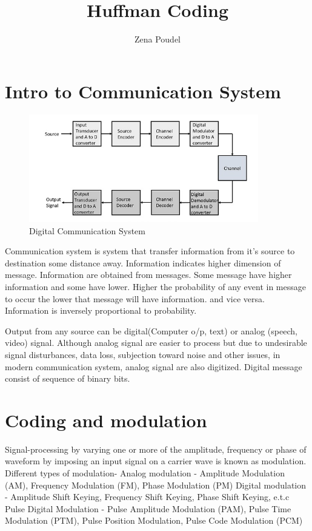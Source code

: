 \documentclass[10pt,a4paper]{article}
\author{Zena Poudel}
\title{Huffman Coding}
\begin{document}
	\maketitle
	\section{Intro to Communication System}
	\begin{figure}[htp]
		\centering
		\includegraphics[width=10cm]{Image 1}
		\caption{Digital Communication System}
		\label{fig:Image 1}
	\end{figure}
	Communication system is system that transfer information from it’s source to destination some distance away. Information indicates higher dimension of message. Information are obtained from messages. Some message have higher information and some have lower. Higher the probability of any event in message to occur the lower that message will have information. and vice versa. Information is inversely proportional to probability. 
	
	Output from any source can be digital(Computer o/p, text) or analog (speech, video) signal. Although analog signal are easier to process but due to undesirable signal disturbances, data loss, subjection toward noise and other issues, in modern communication system, analog signal are also digitized. Digital message consist of sequence of binary bits. 
	\section{Coding and modulation}
	Signal-processing by varying one or more of the amplitude, frequency or phase of waveform by imposing an input signal on a carrier wave is known as modulation. Different types of modulation- 
	\newline
	Analog modulation - Amplitude Modulation (AM), Frequency Modulation (FM), Phase Modulation (PM) 
	\newline 
	Digital modulation - Amplitude Shift Keying, Frequency Shift Keying, Phase Shift Keying, e.t.c
	\newline
	Pulse Digital Modulation - Pulse Amplitude Modulation (PAM), Pulse Time Modulation (PTM), Pulse Position Modulation, Pulse Code Modulation (PCM) 
	\newline
\end{document}
